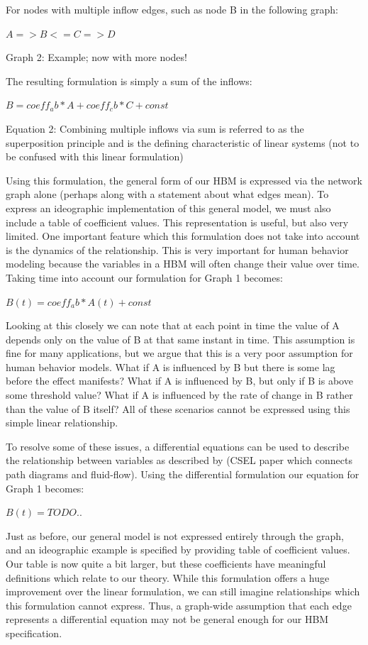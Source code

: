 \documentclass[conference]{IEEEtran}
\begin{document}
For nodes with multiple inflow edges, such as node B in the following graph:

$A => B <= C => D$

Graph 2: Example; now with more nodes!

The resulting formulation is simply a sum of the inflows:

$B = coeff_ab*A + coeff_cb*C + const$

Equation 2: Combining multiple inflows via sum is referred to as the superposition principle and is the defining characteristic of linear systems (not to be confused with this linear formulation)

Using this formulation, the general form of our HBM is expressed via the network graph alone (perhaps along with a statement about what edges mean).
To express an ideographic implementation of this general model, we must also include a table of coefficient values. This representation is useful, but also very limited.
One important feature which this formulation does not take into account is the dynamics of the relationship.
This is very important for human behavior modeling because the variables in a HBM will often change their value over time.
Taking time into account our formulation for Graph 1 becomes:

$B(t) = coeff_ab*A(t) + const$

Looking at this closely we can note that at each point in time the value of A depends only on the value of B at that same instant in time.
This assumption is fine for many applications, but we argue that this is a very poor assumption for human behavior models. What if A is influenced by B but there is some lag before the effect manifests?
What if A is influenced by B, but only if B is above some threshold value? What if A is influenced by the rate of change in B rather than the value of B itself? All of these scenarios cannot be expressed using this simple linear relationship. 

To resolve some of these issues, a differential equations can be used to describe the relationship between variables as described by (CSEL paper which connects path diagrams and fluid-flow). Using the differential formulation our equation for Graph 1 becomes:

$B(t) = TODO..$

Just as before, our general model is not expressed entirely through the graph, and an ideographic example is specified by providing table of coefficient values.
Our table is now quite a bit larger, but these coefficients have meaningful definitions which relate to our theory.
While this formulation offers a huge improvement over the linear formulation, we can still imagine relationships which this formulation cannot express.
Thus, a graph-wide assumption that each edge represents a differential equation may not be general enough for our HBM specification. 
\end{document}

